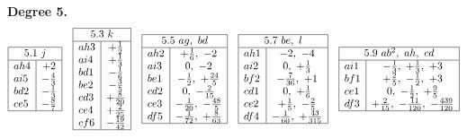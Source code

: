 \documentclass[11pt]{article}
\begin{document}
\noindent\textbf{Degree 5.}
\[
\begin{array}{|l|c|}\hline
\multicolumn{2}{|c|}{5.1\ j}\\\hline
ah4 & +2 \\
ai5 & -\tfrac{4}{3} \\
bd2 & -\tfrac{1}{3} \\
ce5 & -\tfrac{8}{7} \\\hline
\end{array}\quad
\begin{array}{|l|c|}\hline
\multicolumn{2}{|c|}{5.3\ k}\\\hline
ah3 & +\tfrac{1}{2} \\
ai4 & +\tfrac{1}{3} \\
bd1 & -\tfrac{1}{6} \\
be2 & -\tfrac{3}{5} \\
cd3 & +\tfrac{8}{20} \\
ce4 & +\tfrac{2}{25} \\
cf6 & -\tfrac{19}{42} \\\hline
\end{array}\quad
\begin{array}{|l|c|}\hline
\multicolumn{2}{|c|}{5.5\ ag,\ bd}\\\hline
ah2 & +\tfrac{1}{6},\ -2 \\
ai3 & 0,\ -2 \\
be1 & -\tfrac{1}{2},\ +\tfrac{24}{5} \\
cd2 & 0,\ -\tfrac{2}{15} \\
ce3 & -\tfrac{1}{20},\ -\tfrac{48}{5} \\
df5 & -\tfrac{1}{72},\ +\tfrac{8}{63} \\\hline
\end{array}\quad
\begin{array}{|l|c|}\hline
\multicolumn{2}{|c|}{5.7\ be,\ l}\\\hline
ah1 & -2,\ -4 \\
ai2 & 0,\ +\tfrac{1}{3} \\
bf2 & -\tfrac{7}{36},\ +1 \\
cd1 & 0,\ +\tfrac{1}{6} \\
ce2 & +\tfrac{1}{5},\ -\tfrac{2}{5} \\
df4 & -\tfrac{1}{60},\ +\tfrac{43}{315} \\\hline
\end{array}\quad
\begin{array}{|l|c|}\hline
\multicolumn{2}{|c|}{5.9\ ab^{2},\ ah,\ cd}\\\hline
ai1 & -\tfrac{1}{3},\ +\tfrac{1}{3},\ +3 \\
bf1 & +\tfrac{2}{5},\ -\tfrac{1}{2},\ +3 \\
ce1 & 0,\ -\tfrac{1}{2},\ +\tfrac{9}{5} \\
df3 & +\tfrac{2}{15},\ -\tfrac{11}{120},\ -\tfrac{439}{120} \\\hline
\end{array}
\]
\end{document}
